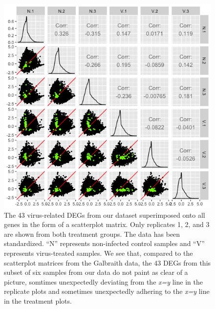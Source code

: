\documentclass[11pt,a4paper,oldfontcommands,openany]{memoir}
\numberwithin{equation}{section} %
\begin{document}
\begin{figure}[H]
  \includegraphics[width=\textwidth]{Images/RutterSM1}
  \caption{The 43 virus-related DEGs from our dataset superimposed onto all genes in the form of a scatterplot matrix. Only replicates 1, 2, and 3 are shown from both treatment groups. The data has been standardized. ``N'' represents non-infected control samples and ``V'' represents virus-treated samples. We see that, compared to the scatterplot matrices from the Galbraith data, the 43 DEGs from this subset of six samples from our data do not paint as clear of a picture, somtimes unexpectedly deviating from the \textit{x=y} line in the replicate plots and sometimes unexpectedly adhering to the \textit{x=y} line in the treatment plots.}
  \label{fig:RutterSM1}
\end{figure}
\end{document}
